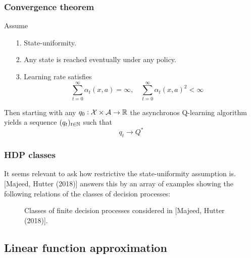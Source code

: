 \documentclass{beamer}[10]
\begin{document}
\begin{frame}
  \frametitle{Convergence theorem}
  \begin{thm}
    Assume
    \begin{itemize}
      \item[1.] State-uniformity.
      \item[2.] Any state is reached eventually under any policy.
      \item[3.] Learning rate satisfies
	\[ \sum_{t=0}^\infty \alpha_t(x, a) = \infty, \quad
	\sum_{t=0}^\infty \alpha_t(x, a)^2 < \infty \]
    \end{itemize}
    Then starting with any $q_0 : \mathcal{X} \times \mathcal{A} \to \mathbb{R}$
    the asynchronos Q-learning algorithm yields a sequence
    $(q_t)_{t \in \mathbb{N}}$ such that
    \[q_t \to Q^* \] 
  \end{thm}
\end{frame}

\begin{frame}
  \frametitle{HDP classes}
  \begin{footnotesize}
  It seems relevant to ask how restrictive the state-uniformity assumption is.
  [Majeed, Hutter (2018)]
  answers this by an array of examples showing the following
  relations of the classes of decision processes:
  \begin{figure}[H]
    \centering
    \caption{Classes of finite decision processes considered in
      [Majeed, Hutter (2018)].
    }
  \end{figure}
\end{footnotesize}
\end{frame}

\subsection{Linear function approximation}
\end{document}
